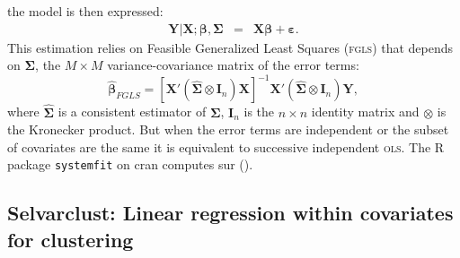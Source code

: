 \documentclass[12pt,a4paper]{report}
\begin{document}
		the model is then expressed:
		\begin{eqnarray}
			\boldsymbol{Y}|\boldsymbol{X};\boldsymbol{\beta},\boldsymbol{\Sigma}&=&\boldsymbol{X}\boldsymbol{\beta}+\boldsymbol{\varepsilon}. \nonumber
		\end{eqnarray}
		 This estimation relies on Feasible Generalized Least Squares (\textsc{fgls}) that depends on $\boldsymbol{\Sigma}$, the $M \times M$ variance-covariance matrix of the error terms:
		 \begin{equation}
		 	\hat{\boldsymbol{\beta}}_{FGLS}= [\boldsymbol{X}'(\hat{\boldsymbol{\Sigma}} \otimes \boldsymbol{I}_n)\boldsymbol{X} ]^{-1}\boldsymbol{X}'(\hat{\boldsymbol{\Sigma}} \otimes \boldsymbol{I}_n) \boldsymbol{Y},  \nonumber
\end{equation}		  
		 where $\hat{\boldsymbol{\Sigma}}$ is a consistent estimator of $\boldsymbol{\Sigma}$, $\boldsymbol{I}_n$ is the $n\times n$ identity matrix and $\otimes$ is the Kronecker product.
		 But when the error terms are independent or the subset of covariates are the same it is equivalent to successive independent \textsc{ols}. The R package {\tt systemfit} on {\sc cran} computes {\sc sur} (\cite{packagesystemfit}). 
%			
%
		\subsection{Selvarclust: Linear regression within covariates for clustering}		%
\end{document}

